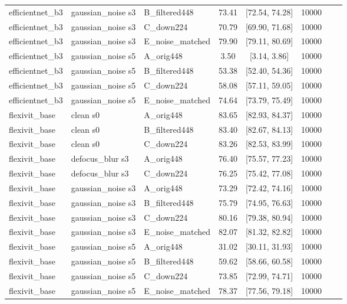 \begin{table}[t]
\begin{tabular}{lllccccc}
efficientnet_b3 & gaussian_noise s3 & B_filtered448 & 73.41 & [72.54, 74.28] & 10000 \\
efficientnet_b3 & gaussian_noise s3 & C_down224 & 70.79 & [69.90, 71.68] & 10000 \\
efficientnet_b3 & gaussian_noise s3 & E_noise_matched & 79.90 & [79.11, 80.69] & 10000 \\
efficientnet_b3 & gaussian_noise s5 & A_orig448 & 3.50 & [3.14, 3.86] & 10000 \\
efficientnet_b3 & gaussian_noise s5 & B_filtered448 & 53.38 & [52.40, 54.36] & 10000 \\
efficientnet_b3 & gaussian_noise s5 & C_down224 & 58.08 & [57.11, 59.05] & 10000 \\
efficientnet_b3 & gaussian_noise s5 & E_noise_matched & 74.64 & [73.79, 75.49] & 10000 \\
flexivit_base & clean s0 & A_orig448 & 83.65 & [82.93, 84.37] & 10000 \\
flexivit_base & clean s0 & B_filtered448 & 83.40 & [82.67, 84.13] & 10000 \\
flexivit_base & clean s0 & C_down224 & 83.26 & [82.53, 83.99] & 10000 \\
flexivit_base & defocus_blur s3 & A_orig448 & 76.40 & [75.57, 77.23] & 10000 \\
flexivit_base & defocus_blur s3 & C_down224 & 76.25 & [75.42, 77.08] & 10000 \\
flexivit_base & gaussian_noise s3 & A_orig448 & 73.29 & [72.42, 74.16] & 10000 \\
flexivit_base & gaussian_noise s3 & B_filtered448 & 75.79 & [74.95, 76.63] & 10000 \\
flexivit_base & gaussian_noise s3 & C_down224 & 80.16 & [79.38, 80.94] & 10000 \\
flexivit_base & gaussian_noise s3 & E_noise_matched & 82.07 & [81.32, 82.82] & 10000 \\
flexivit_base & gaussian_noise s5 & A_orig448 & 31.02 & [30.11, 31.93] & 10000 \\
flexivit_base & gaussian_noise s5 & B_filtered448 & 59.62 & [58.66, 60.58] & 10000 \\
flexivit_base & gaussian_noise s5 & C_down224 & 73.85 & [72.99, 74.71] & 10000 \\
flexivit_base & gaussian_noise s5 & E_noise_matched & 78.37 & [77.56, 79.18] & 10000 \\
\bottomrule
\end{tabular}
\end{table}